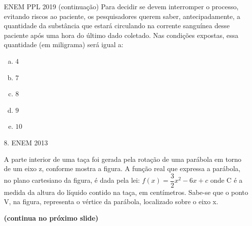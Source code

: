 \documentclass[11pt]{beamer}
\begin{document}
\begin{frame}{ENEM PPL 2019 (continuação)}
    Para decidir se devem interromper o processo, evitando riscos ao paciente, os pesquisadores querem saber, antecipadamente, a quantidade da substância que estará circulando na corrente sanguínea desse paciente após uma hora do último dado coletado. Nas condições expostas, essa quantidade (em miligrama) será igual a:

    \begin{enumerate}[a)]
        \item $4$
        \item $7$ %
        \item $8$ 
        \item $9$ 
        \item $10$ 
    \end{enumerate}
\end{frame}

\begin{frame}{8. ENEM 2013}
    
    A parte interior de uma taça foi gerada pela rotação de uma parábola em torno de um eixo z, conforme mostra a figura. A função real que expressa a parábola, no plano cartesiano da figura, é dada pela lei: $f(x)=\dfrac{3}{2}x^{2}-6x+c$ onde C é a medida da altura do líquido contido na taça, em centímetros. Sabe-se que o ponto V, na figura, representa o vértice da parábola, localizado sobre o eixo x. 

    \vfill
    \textbf{(continua no próximo slide)}
    
\end{frame}
\end{document}
